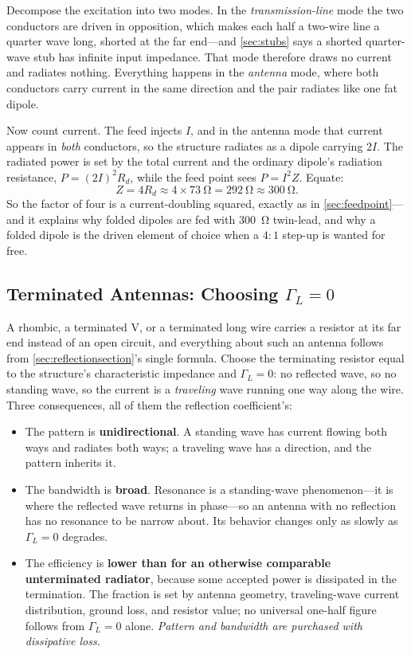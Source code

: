 Decompose the excitation into two modes. In the \emph{transmission-line} mode the two
conductors are driven in opposition, which makes each half a two-wire line a quarter
wave long, shorted at the far end---and \cref{sec:stubs} says a shorted quarter-wave
stub has infinite input impedance. That mode therefore draws no current and radiates
nothing. Everything happens in the \emph{antenna} mode, where both conductors carry
current in the same direction and the pair radiates like one fat dipole.

Now count current. The feed injects \(I\), and in the antenna mode that current
appears in \emph{both} conductors, so the structure radiates as a dipole carrying
\(2I\). The radiated power is set by the total current and the ordinary dipole's
radiation resistance, \(P=(2I)^2R_d\), while the feed point sees \(P=I^2Z\). Equate:
\[
Z=4R_d\approx4\times\SI{73}{\ohm}=\SI{292}{\ohm}\approx\SI{300}{\ohm}.
\]
So the factor of four is a current-doubling squared, exactly as in
\cref{sec:feedpoint}---and it explains why folded dipoles are fed with
\SI{300}{\ohm} twin-lead, and why a folded dipole is the driven element of choice
when a \(4{:}1\) step-up is wanted for free.

\subsection{Terminated Antennas: Choosing \texorpdfstring{\(\Gamma_L=0\)}{Gamma L = 0}}
\label{sec:travelingwave}
A rhombic, a terminated V, or a terminated long wire carries a resistor at its far end
instead of an open circuit, and everything about such an antenna follows from
\cref{sec:reflectionsection}'s single formula. Choose the terminating resistor equal to
the structure's characteristic impedance and \(\Gamma_L=0\): no reflected wave, so no
standing wave, so the current is a \emph{traveling} wave running one way along the
wire. Three consequences, all of them the reflection coefficient's:
\begin{itemize}
\item The pattern is \textbf{unidirectional}. A standing wave has current flowing both
ways and radiates both ways; a traveling wave has a direction, and the pattern
inherits it.
\item The bandwidth is \textbf{broad}. Resonance is a standing-wave phenomenon---it is
where the reflected wave returns in phase---so an antenna with no reflection has no
resonance to be narrow about. Its behavior changes only as slowly as \(\Gamma_L=0\)
degrades.
\item The efficiency is \textbf{lower than for an otherwise comparable unterminated
radiator}, because some accepted power is dissipated in the termination. The fraction
is set by antenna geometry, traveling-wave current distribution, ground loss, and
resistor value; no universal one-half figure follows from \(\Gamma_L=0\) alone.
\emph{Pattern and bandwidth are purchased with dissipative loss.}
\end{itemize}


